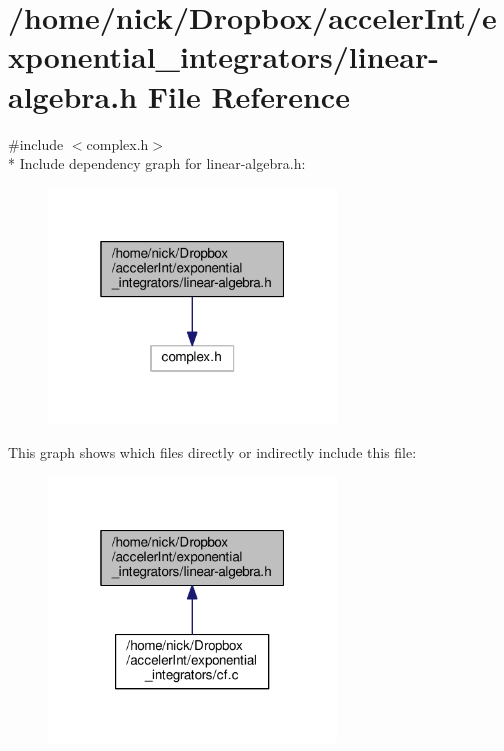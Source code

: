 \hypertarget{linear-algebra_8h}{}\section{/home/nick/\+Dropbox/acceler\+Int/exponential\+\_\+integrators/linear-\/algebra.h File Reference}
\label{linear-algebra_8h}
{\ttfamily \#include $<$complex.\+h$>$}\\*
Include dependency graph for linear-\/algebra.h\+:
\nopagebreak
\begin{figure}[H]
\begin{center}
\leavevmode
\includegraphics[width=217pt]{linear-algebra_8h__incl}
\end{center}
\end{figure}
This graph shows which files directly or indirectly include this file\+:
\nopagebreak
\begin{figure}[H]
\begin{center}
\leavevmode
\includegraphics[width=217pt]{linear-algebra_8h__dep__incl}
\end{center}
\end{figure}
